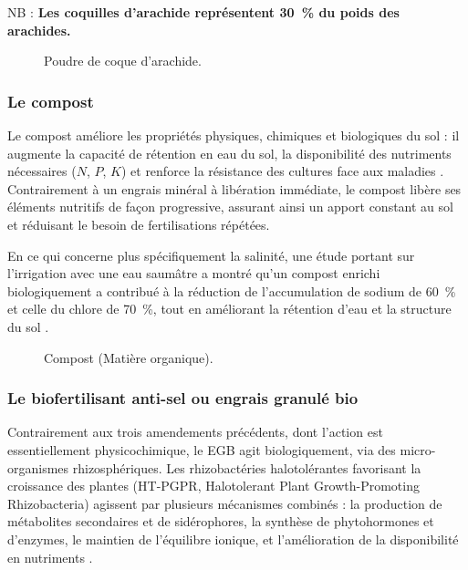 NB : \textbf{Les coquilles d’arachide représentent 30~\% du poids des arachides.}

\begin{figure}[H]
    \centering
{}
    \caption{Poudre de coque d’arachide. }
    \label{fig:arrachide2}
\end{figure}

\subsubsection{Le compost}
Le compost améliore les propriétés physiques, chimiques et biologiques du sol : il augmente la capacité de rétention en eau du sol, 
la disponibilité des nutriments nécessaires ($N$, $P$, $K$) et renforce la résistance des cultures face aux maladies \cite{goldan_assessment_2023}. 
Contrairement à un engrais minéral à libération immédiate, le compost libère ses éléments nutritifs de façon progressive, assurant ainsi un apport constant au sol et réduisant le besoin de fertilisations répétées.

En ce qui concerne plus spécifiquement la salinité, une étude portant sur l’irrigation
avec une eau saumâtre a montré qu’un compost enrichi biologiquement a contribué à
la réduction de l’accumulation de sodium de 60~\% et celle du chlore de 70~\%, tout en
améliorant la rétention d’eau et la structure du sol \cite{suvendran_soil_2025}.

\begin{figure}[H]
    \centering
{}
    \caption{Compost (Matière organique). }
    \label{fig:compost2}
\end{figure}

\subsubsection{Le biofertilisant anti-sel ou engrais granulé bio}
Contrairement aux trois amendements précédents, dont l’action est essentiellement physicochimique, le EGB agit biologiquement, via des micro-organismes rhizosphériques. 
Les rhizobactéries halotolérantes favorisant la croissance des plantes (HT-PGPR, Halotolerant Plant Growth-Promoting Rhizobacteria) agissent par plusieurs mécanismes combinés : 
la production de métabolites secondaires et de sidérophores, la synthèse de phytohormones et d’enzymes, le maintien de l’équilibre ionique, et l’amélioration de la disponibilité en nutriments \cite{ramasamy_coping_2023}.

